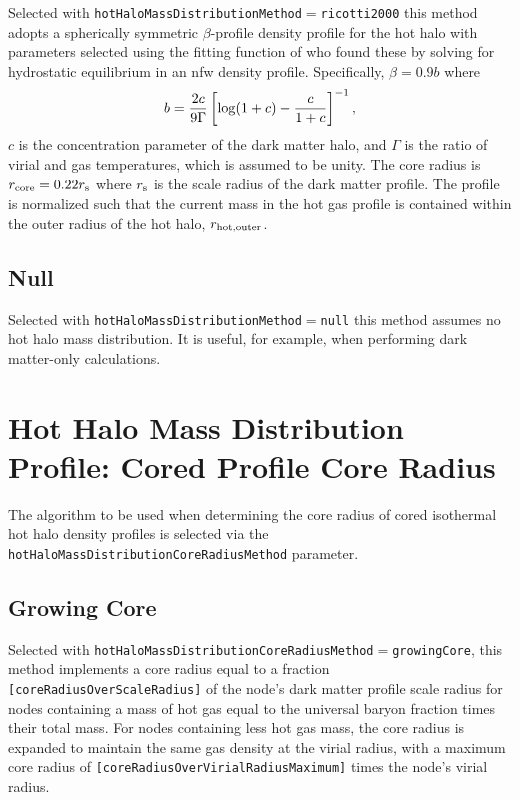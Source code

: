 Selected with {\tt hotHaloMassDistributionMethod}$=${\tt ricotti2000} this method adopts a spherically symmetric $\beta$-profile density profile for the hot halo with parameters selected using the fitting function of \cite{ricotti_feedback_2000} who found these by solving for hydrostatic equilibrium in an \gls{nfw} density profile. Specifically, $\beta = 0.9 b$ where
\begin{equation}
 b = {2 c \over 9 \Gamma} \left[ \log(1+c) - {c\over 1+c}\right]^{-1},
\end{equation}
$c$ is the concentration parameter of the dark matter halo, and $\Gamma$ is the ratio of virial and gas temperatures, which is assumed to be unity. The core radius is $r_{\rm core} = 0.22 r_{\rm s}$ where $r_{\rm s}$ is the scale radius of the dark matter profile. The profile is normalized such that the current mass in the hot gas profile is contained within the outer radius of the hot halo, $r_{\rm hot, outer}$.

\subsection{Null}\label{phys:hotHaloMassDistribution:hotHaloMassDistributionNull}

Selected with {\tt hotHaloMassDistributionMethod}$=${\tt null} this method assumes no hot halo mass distribution. It is useful, for example, when performing dark matter-only calculations.

\section{Hot Halo Mass Distribution Profile: Cored Profile Core Radius}\label{sec:hotHaloDensityProfileCoredIsothermalCoreRadius}

The algorithm to be used when determining the core radius of cored isothermal hot halo density profiles is selected via the {\tt hotHaloMassDistributionCoreRadiusMethod} parameter.

\subsection{Growing Core}\label{phys:hotHaloMassDistributionCoreRadius:hotHaloMassDistributionCoreRadiusGrowing}

Selected with {\tt hotHaloMassDistributionCoreRadiusMethod}$=${\tt growingCore}, this method implements a core radius equal to a fraction {\tt [coreRadiusOverScaleRadius]} of the node's dark matter profile scale radius for nodes containing a mass of hot gas equal to the universal baryon fraction times their total mass. For nodes containing less hot gas mass, the core radius is expanded to maintain the same gas density at the virial radius, with a maximum core radius of {\tt [coreRadiusOverVirialRadiusMaximum]} times the node's virial radius.

